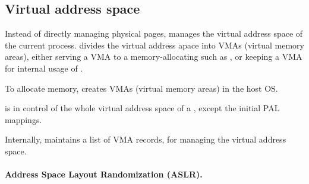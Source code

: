 \subsection{Virtual address space}
\label{sec:libos:vma}


Instead of directly managing physical pages, \thelibos{} manages the virtual address space of the current process.
\thelibos{} divides the virtual address apace into VMAs (virtual memory areas),
either serving a VMA to a memory-allocating \linuxapi{} such as ,
or keeping a VMA 
for internal usage of \thelibos{}.





To allocate memory, \thelibos{} creates VMAs (virtual memory areas)
in the host OS.



\thelibos{} is in control of the whole virtual address space of a \picoproc{},
except the initial PAL mappings.








Internally, \thelibos{} maintains a list of VMA records, for managing the virtual address space.









\paragraph{Address Space Layout Randomization (ASLR).}

